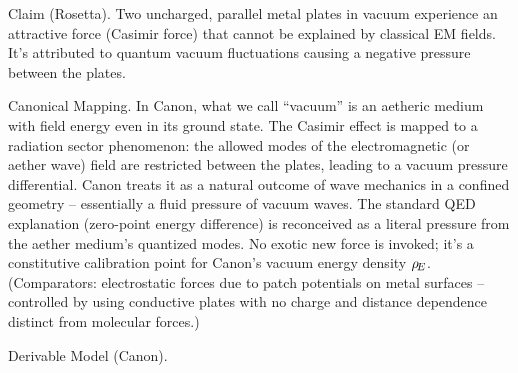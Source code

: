 \documentclass[11pt]{article}
\begin{document}
Claim (Rosetta). Two uncharged, parallel metal plates in vacuum experience an attractive force (Casimir force) that cannot be explained by classical EM fields. It’s attributed to quantum vacuum fluctuations causing a negative pressure between the plates.


Canonical Mapping. In Canon, what we call “vacuum” is an aetheric medium with field energy even in its ground state. The Casimir effect is mapped to a radiation sector phenomenon: the allowed modes of the electromagnetic (or aether wave) field are restricted between the plates, leading to a vacuum pressure differential. Canon treats it as a natural outcome of wave mechanics in a confined geometry – essentially a fluid pressure of vacuum waves. The standard QED explanation (zero-point energy difference) is reconceived as a literal pressure from the aether medium’s quantized modes. No exotic new force is invoked; it’s a constitutive calibration point for Canon’s vacuum energy density $\rho_{\!E}$. (Comparators: electrostatic forces due to patch potentials on metal surfaces – controlled by using conductive plates with no charge and distance dependence distinct from molecular forces.)


Derivable Model (Canon).
\end{document}
